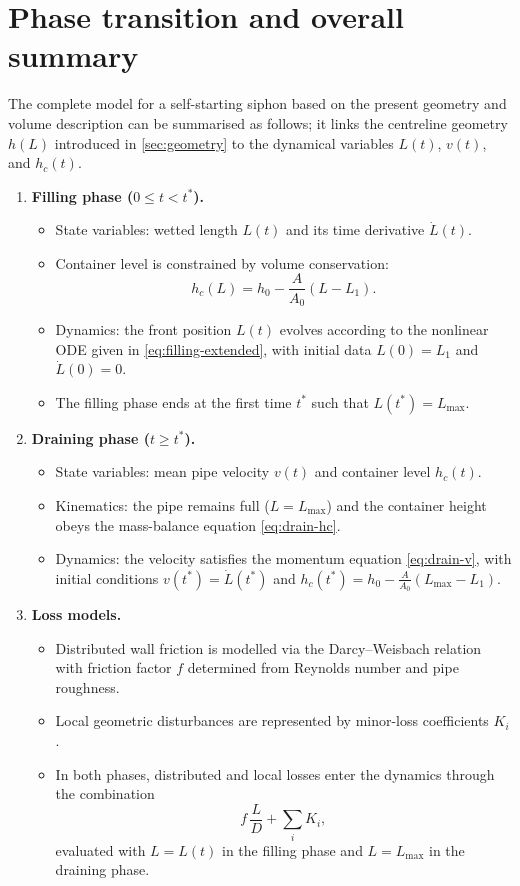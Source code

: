 \documentclass[11pt]{article}
\begin{document}
\section{Phase transition and overall summary}

The complete model for a self-starting siphon based on the present geometry and volume
description can be summarised as follows; it links the centreline geometry $h(L)$ introduced in \cref{sec:geometry} to the dynamical variables $L(t)$, $v(t)$, and $h_c(t)$.
\begin{enumerate}
  \item \textbf{Filling phase ($0 \le t < t^*$).}
    \begin{itemize}
      \item State variables: wetted length $L(t)$ and its time derivative $\dot L(t)$.
      \item Container level is constrained by volume conservation:
            \[
              h_c(L) = h_0 - \frac{A}{A_0}(L - L_1).
            \]
      \item Dynamics: the front position $L(t)$ evolves according to the nonlinear ODE
            given in \eqref{eq:filling-extended},
            with initial data $L(0) = L_1$ and $\dot L(0) = 0$.
      \item The filling phase ends at the first time $t^*$ such that $L(t^*) = L_{\max}$.
    \end{itemize}
  \item \textbf{Draining phase ($t \ge t^*$).}
    \begin{itemize}
      \item State variables: mean pipe velocity $v(t)$ and container level $h_c(t)$.
      \item Kinematics: the pipe remains full ($L = L_{\max}$) and the container height obeys
            the mass-balance equation \eqref{eq:drain-hc}.
      \item Dynamics: the velocity satisfies the momentum equation \eqref{eq:drain-v},
            with initial conditions
            $v(t^*) = \dot L(t^*)$ and
            $h_c(t^*) = h_0 - \frac{A}{A_0}(L_{\max} - L_1)$.
    \end{itemize}
  \item \textbf{Loss models.}
    \begin{itemize}
      \item Distributed wall friction is modelled via the Darcy--Weisbach relation with
            friction factor $f$ determined from Reynolds number and pipe roughness.
      \item Local geometric disturbances are represented by minor-loss coefficients $K_i$.
      \item In both phases, distributed and local losses enter the dynamics through the
            combination
            \[
              f\,\frac{L}{D} + \sum_i K_i,
            \]
            evaluated with $L = L(t)$ in the filling phase and $L = L_{\max}$ in the
            draining phase.
    \end{itemize}
\end{enumerate}
\end{document}
